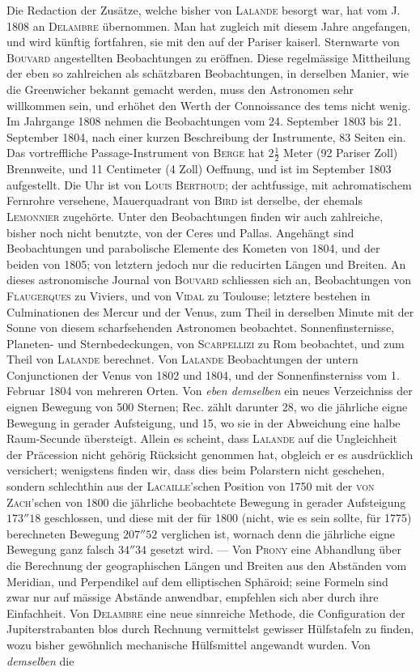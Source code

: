 Die Redaction der Zusätze, welche bisher von \textsc{Lalande} besorgt war, hat vom J. 1808 an \textsc{Delambre} übernommen. Man hat zugleich mit diesem Jahre angefangen, und wird künftig fortfahren, sie mit den auf der Pariser kaiserl. Sternwarte von \textsc{Bouvard} angestellten Beobachtungen zu eröffnen. Diese regelmässige Mittheilung der eben so zahlreichen als schätzbaren Beobachtungen, in derselben Manier, wie die Greenwicher bekannt gemacht werden, muss den Astronomen sehr willkommen sein, und erhöhet den Werth der Connoissance des tems nicht wenig. Im Jahrgange 1808 nehmen die Beobachtungen vom 24. September 1803 bis 21. September 1804, nach einer kurzen Beschreibung der Instrumente, 83 Seiten ein. Das vortreffliche Passage-Instrument von \textsc{Berge} hat $2\frac{1}{2}$ Meter (92 Pariser Zoll) Brennweite, und 11 Centimeter (4 Zoll) Oeffnung, und ist im September 1803 aufgestellt. Die Uhr ist von \textsc{Louis Berthoud}; der achtfussige, mit achromatischem Fernrohre versehene, Mauerquadrant von \textsc{Bird} ist derselbe, der ehemals \textsc{Lemonnier} zugehörte. Unter den Beobachtungen finden wir auch zahlreiche, bisher noch nicht benutzte, von der Ceres und Pallas. Angehängt sind Beobachtungen und parabolische Elemente des Kometen von 1804, und der beiden von 1805; von letztern jedoch nur die reducirten Längen und Breiten. An dieses astronomische Journal von \textsc{Bouvard} schliessen sich an, Beobachtungen von \textsc{Flaugerques} zu Viviers, und von \textsc{Vidal} zu Toulouse;  letztere bestehen in Culminationen des Mercur und der Venus, zum Theil in derselben Minute mit der Sonne von diesem scharfsehenden Astronomen beobachtet. Sonnenfinsternisse, Planeten- und Sternbedeckungen, von \textsc{Scarpellizi} zu Rom beobachtet, und zum Theil von \textsc{Lalande} berechnet. Von \textsc{Lalande} Beobachtungen der untern Conjunctionen der Venus von 1802 und 1804, und der Sonnenfinsterniss vom 1. Februar 1804 von mehreren Orten. Von \emph{eben demselben} ein neues Verzeichniss der eignen Bewegung von 500 Sternen; Rec. zählt darunter 28, wo die jährliche eigne Bewegung in gerader Aufsteigung, und 15, wo sie in der Abweichung eine halbe Raum-Secunde übersteigt. Allein es scheint, dass \textsc{Lalande} auf die Ungleichheit der Präcession nicht gehörig Rücksicht genommen hat, obgleich er es ausdrücklich versichert; wenigstens finden wir, dass dies beim Polarstern nicht geschehen, sondern schlechthin aus der \textsc{Lacaille}'schen Position von 1750 mit der \textsc{von Zach}'schen von 1800 die jährliche beobachtete Bewegung in gerader Aufsteigung $173''18$ geschlossen, und diese mit der für 1800 (nicht, wie es sein sollte, für 1775) berechneten Bewegung $207''52$ verglichen ist, wornach denn die jährliche eigne Bewegung ganz falsch $34''34$ gesetzt wird. --- Von \textsc{Prony} eine Abhandlung über die Berechnung der geographischen Längen und Breiten aus den Abständen vom Meridian, und Perpendikel auf dem elliptischen Sphäroid; seine Formeln sind zwar nur auf mässige Abstände anwendbar, empfehlen sich aber durch ihre Einfachheit. Von \textsc{Delambre} eine neue sinnreiche Methode, die Configuration der Jupiterstrabanten blos durch Rechnung vermittelst gewisser Hülfstafeln zu finden, wozu bisher gewöhnlich mechanische Hülfsmittel angewandt wurden. Von \emph{demselben} die 